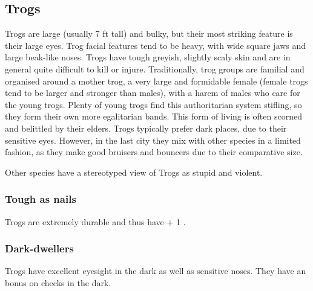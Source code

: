 \documentclass[a4paper,11pt,oneside]{book}
\newcommand{\textlf}[1]{\textbf{\titlecap{#1}}}
\begin{document}
\subsection{Trogs}
Trogs are large (usually 7 ft tall) and bulky, but their most striking feature is their large eyes. Trog facial features tend to be heavy, with wide square jaws and large beak-like noses. Trogs have tough greyish, slightly scaly skin and are in general quite difficult to kill or injure. Traditionally, trog groups are familial and organised around a mother trog, a very large and formidable female (female trogs tend to be larger and stronger than males), with a harem of males who care for the young trogs. Plenty of young trogs find this authoritarian system stifling, so they form their own more egalitarian bands. This form of living is often scorned and belittled by their elders. Trogs typically prefer dark places, due to their sensitive eyes. However, in the last city they mix with other species in a limited fashion, as they make good bruisers and bouncers due to their comparative size.

Other species have a stereotyped view of Trogs as stupid and violent.  

\subsubsection*{Tough as nails}
Trogs are extremely durable and thus have + 1 \textlf{endurance}.

\subsubsection*{Dark-dwellers}
Trogs have excellent eyesight in the dark as well as sensitive noses. They have an \textlf{edge} bonus on \textlf{awareness} checks in the dark.
\end{document}
